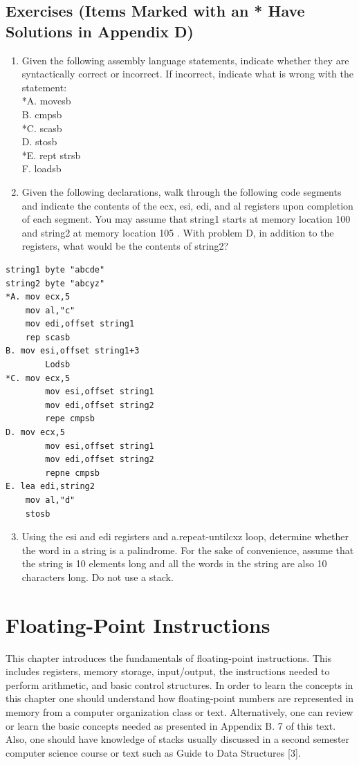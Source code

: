 \documentclass[10pt]{book}
\begin{document}
\subsection{Exercises (Items Marked with an * Have Solutions in Appendix D)}
\begin{enumerate}
  \item Given the following assembly language statements, indicate whether they are syntactically correct or incorrect. If incorrect, indicate what is wrong with the statement:\\
*A. movesb\\
B. cmpsb\\
*C. scasb\\
D. stosb\\
*E. rept strsb\\
F. loadsb
  \item Given the following declarations, walk through the following code segments and indicate the contents of the ecx, esi, edi, and al registers upon completion of each segment. You may assume that string1 starts at memory location 100 and string2 at memory location 105 . With problem D, in addition to the registers, what would be the contents of string2?
\end{enumerate}

\begin{verbatim}
string1 byte "abcde"
string2 byte "abcyz"
*A. mov ecx,5
    mov al,"c"
    mov edi,offset string1
    rep scasb
B. mov esi,offset string1+3
        Lodsb
*C. mov ecx,5
        mov esi,offset string1
        mov edi,offset string2
        repe cmpsb
D. mov ecx,5
        mov esi,offset string1
        mov edi,offset string2
        repne cmpsb
E. lea edi,string2
    mov al,"d"
    stosb
\end{verbatim}

\begin{enumerate}
  \setcounter{enumi}{2}
  \item Using the esi and edi registers and a.repeat-untilcxz loop, determine whether the word in a string is a palindrome. For the sake of convenience, assume that the string is 10 elements long and all the words in the string are also 10 characters long. Do not use a stack.
\end{enumerate}


\section{Floating-Point Instructions}
This chapter introduces the fundamentals of floating-point instructions. This includes registers, memory storage, input/output, the instructions needed to perform arithmetic, and basic control structures. In order to learn the concepts in this chapter one should understand how floating-point numbers are represented in memory from a computer organization class or text. Alternatively, one can review or learn the basic concepts needed as presented in Appendix B. 7 of this text. Also, one should have knowledge of stacks usually discussed in a second semester computer science course or text such as Guide to Data Structures [3].
\end{document}
